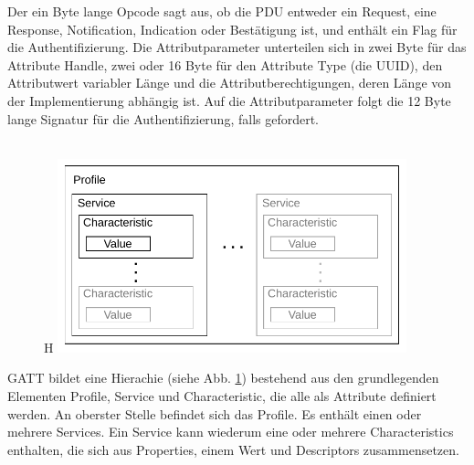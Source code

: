 Der ein Byte lange Opcode sagt aus, ob die PDU entweder ein Request, eine Response, Notification, Indication oder Bestätigung ist, und enthält ein Flag für die Authentifizierung. Die Attributparameter unterteilen sich in zwei Byte für das Attribute Handle, zwei oder 16 Byte für den Attribute Type (die UUID), den Attributwert variabler Länge und die Attributberechtigungen, deren Länge von der Implementierung abhängig ist. Auf die Attributparameter folgt die 12 Byte lange Signatur für die Authentifizierung, falls gefordert. \cite{BtSpec4.0_1888-1889}
\\\\

\begin{figure}{H}
    \centering
    \includegraphics[width=0.9\textwidth]{graphics/gatt_hierarchie.pdf}
    \caption[]{\cite{BtSpec4.0_fig_1892}}
    \label{fig: gatt hierarchie}
\end{figure}

GATT bildet eine Hierachie (siehe Abb. \ref{fig: gatt hierarchie}) bestehend aus den grundlegenden Elementen Profile, Service und Characteristic, die alle als Attribute definiert werden. An oberster Stelle befindet sich das Profile. Es enthält einen oder mehrere Services. Ein Service kann wiederum eine oder mehrere Characteristics enthalten, die sich aus Properties, einem Wert und Descriptors zusammensetzen.